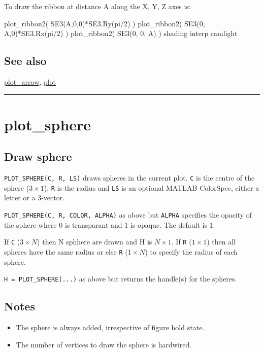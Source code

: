 To draw the ribbon at distance A along the X, Y, Z axes is:

\begin{Code}
    plot_ribbon2( SE3(A,0,0)*SE3.Ry(pi/2) )
    plot_ribbon2( SE3(0, A,0)*SE3.Rx(pi/2) )
    plot_ribbon2( SE3(0, 0, A) )
    shading interp
    camlight

\end{Code}

\subsection*{See also}


\hyperlink{plot_arrow}{\color{blue} plot\_arrow}, \hyperlink{plot}{\color{blue} plot}

\vspace{1.5ex}\rule{\textwidth}{1mm}

\hypertarget{plot\_sphere}{\section*{plot\_sphere}}
\subsection*{Draw sphere}


\texttt{PLOT\_SPHERE(C, R, LS)} draws spheres in the current plot.  \texttt{C} is the
centre of the sphere ($3 \times 1$), \texttt{R} is the radius and \texttt{LS} is an optional MATLAB
ColorSpec, either a letter or a 3-vector.



\texttt{PLOT\_SPHERE(C, R, COLOR, ALPHA)} as above but \texttt{ALPHA} specifies the opacity
of the sphere where 0 is transparant and 1 is opaque.  The default is 1.



If \texttt{C} ($3 \times N$) then N sphhere are drawn and H is $N \times 1$.  If \texttt{R} ($1 \times 1$) then all
spheres have the same radius or else \texttt{R} ($1 \times N$) to specify the radius of
each sphere.



\texttt{H = PLOT\_SPHERE(...)} as above but returns the handle(s) for the
spheres.


\subsection*{Notes}
\begin{itemize}
  \item The sphere is always added, irrespective of figure hold state.
  \item The number of vertices to draw the sphere is hardwired.
\end{itemize}

